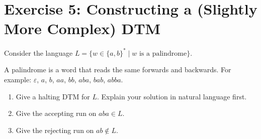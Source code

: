 \documentclass[11pt,a4paper]{article}
\begin{document}
\newpage

\section*{Exercise 5: Constructing a (Slightly More Complex) DTM}

Consider the language $L = \{w \in \{a,b\}^* \mid w \text{ is a palindrome}\}$.

A palindrome is a word that reads the same forwards and backwards. For example: $\varepsilon$, $a$, $b$, $aa$, $bb$, $aba$, $bab$, $abba$.

\begin{enumerate}
    \item Give a halting DTM for $L$. Explain your solution in natural language first.
    \item Give the accepting run on $aba \in L$.
    \item Give the rejecting run on $ab \notin L$.
\end{enumerate}
\end{document}
